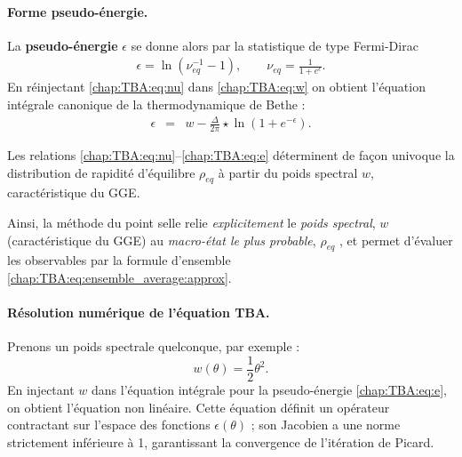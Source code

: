 \paragraph{Forme pseudo-énergie.}
La \textbf{pseudo-énergie} $\epsilon$ se donne alors par la statistique de type Fermi-Dirac
\begin{eqnarray}
	\epsilon =\ln(\nu^{-1}_{\!eq}-1),\qquad\nu_{\!eq}=\frac{1}{1+e^{\epsilon}}.\label{chap:TBA:eq:nu}%
\end{eqnarray}
En réinjectant \eqref{chap:TBA:eq:nu} dans \eqref{chap:TBA:eq:w} on obtient
l’équation intégrale canonique de la thermodynamique de Bethe :
\begin{eqnarray}
	\epsilon & = & w - \frac{\Delta}{2\pi} \star \ln ( 1  + e^{-\epsilon}).\label{chap:TBA:eq:e}%
\end{eqnarray}

Les relations \eqref{chap:TBA:eq:nu}–\eqref{chap:TBA:eq:e} déterminent de façon univoque la distribution de rapidité d’équilibre \(\rho_{\!eq}\) à partir du poids spectral \(w\), caractéristique du \gls{GGE}.

\medskip
Ainsi, la méthode du point selle relie \emph{explicitement} le {\em poids spectral}, $w$  (caractéristique du GGE) au \emph{macro-état le plus probable}, $\rho_{eq}$ , et permet d’évaluer les observables par la formule d’ensemble \eqref{chap:TBA:eq:ensemble_average:approx}.


\paragraph{Résolution numérique de l’équation TBA.}\label{para-algho-TBA}

Prenons un poids spectrale quelconque, par exemple : 
\begin{equation}
  w(\theta)= \frac{1}{2}\theta^2 .\label{eq:TBA:w:quadra}
\end{equation} 
En injectant $w$ dans l’équation intégrale pour la pseudo-énergie \eqref{chap:TBA:eq:e}, on obtient l’équation non linéaire.
Cette équation définit un opérateur contractant sur l’espace des fonctions
\( \epsilon(\theta) \) ; son Jacobien a une norme strictement
inférieure à 1, garantissant la convergence de l’itération de Picard.

